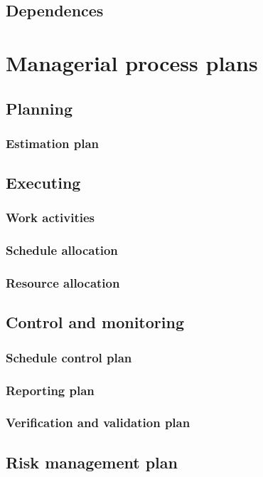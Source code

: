 \documentclass[twocolumn]{article}
\begin{document}
\subsection{Dependences}

\section{Managerial process plans}
\subsection{Planning}
\subsubsection{Estimation plan}

\subsection{Executing}
\subsubsection{Work activities}
\subsubsection{Schedule allocation}
\subsubsection{Resource allocation}

\subsection{Control and monitoring}
\subsubsection{Schedule control plan}
\subsubsection{Reporting plan}
\subsubsection{Verification and validation plan}

\subsection{Risk management plan}
\end{document}
